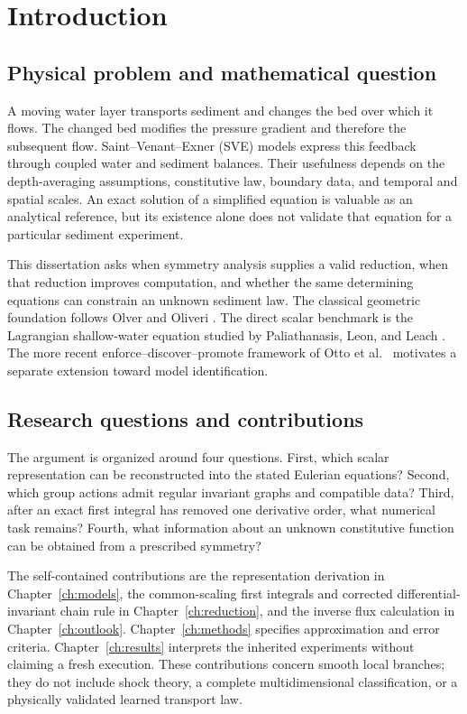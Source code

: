 \documentclass[11pt,a4paper,oneside]{report}
\numberwithin{equation}{chapter}
\begin{document}
\chapter{Introduction}\label{ch:intro}
\section{Physical problem and mathematical question}
A moving water layer transports sediment and changes the bed over which it flows. The changed bed modifies the pressure gradient and therefore the subsequent flow. Saint--Venant--Exner (SVE) models express this feedback through coupled water and sediment balances. Their usefulness depends on the depth-averaging assumptions, constitutive law, boundary data, and temporal and spatial scales. An exact solution of a simplified equation is valuable as an analytical reference, but its existence alone does not validate that equation for a particular sediment experiment.

This dissertation asks when symmetry analysis supplies a valid reduction, when that reduction improves computation, and whether the same determining equations can constrain an unknown sediment law. The classical geometric foundation follows Olver \cite{olver,olver1986} and Oliveri \cite{oliveri2026}. The direct scalar benchmark is the Lagrangian shallow-water equation studied by Paliathanasis, Leon, and Leach \cite{ap}. The more recent enforce--discover--promote framework of Otto et al.\ \cite{otto} motivates a separate extension toward model identification.

\section{Research questions and contributions}
The argument is organized around four questions. First, which scalar representation can be reconstructed into the stated Eulerian equations? Second, which group actions admit regular invariant graphs and compatible data? Third, after an exact first integral has removed one derivative order, what numerical task remains? Fourth, what information about an unknown constitutive function can be obtained from a prescribed symmetry?

The self-contained contributions are the representation derivation in Chapter~\ref{ch:models}, the common-scaling first integrals and corrected differential-invariant chain rule in Chapter~\ref{ch:reduction}, and the inverse flux calculation in Chapter~\ref{ch:outlook}. Chapter~\ref{ch:methods} specifies approximation and error criteria. Chapter~\ref{ch:results} interprets the inherited experiments without claiming a fresh execution. These contributions concern smooth local branches; they do not include shock theory, a complete multidimensional classification, or a physically validated learned transport law.
\end{document}
